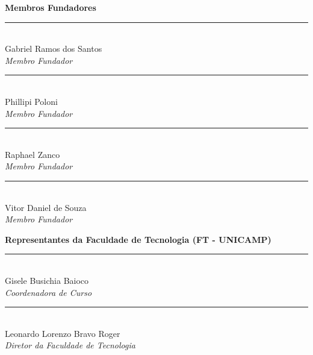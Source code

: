 \documentclass[12pt, a4paper]{article}
\begin{document}
\begin{center}

    \textbf{Membros Fundadores}
    \vspace{2cm}

    \begin{minipage}{0.45\textwidth}
        \centering
        \rule{6cm}{0.4pt} \\
        Gabriel Ramos dos Santos \\
        \textit{Membro Fundador}
    \end{minipage}
    \hspace{0.05\textwidth}
    \begin{minipage}{0.45\textwidth}
        \centering
        \rule{6cm}{0.4pt} \\
        Phillipi Poloni \\
        \textit{Membro Fundador}
    \end{minipage}

    \vspace{2cm}

    \begin{minipage}{0.45\textwidth}
        \centering
        \rule{6cm}{0.4pt} \\
        Raphael Zanco \\
        \textit{Membro Fundador}
    \end{minipage}
    \hspace{0.05\textwidth}
    \begin{minipage}{0.45\textwidth}
        \centering
        \rule{6cm}{0.4pt} \\
        Vitor Daniel de Souza \\
        \textit{Membro Fundador}
    \end{minipage}

    \vspace{2cm}

    \textbf{Representantes da Faculdade de Tecnologia (FT - UNICAMP)}
    \vspace{2cm}

    \begin{minipage}{0.45\textwidth}
        \centering
        \rule{6cm}{0.4pt} \\
        Gisele Busichia Baioco \\
        \textit{Coordenadora de Curso}
    \end{minipage}
    \hspace{0.05\textwidth}
    \begin{minipage}{0.45\textwidth}
        \centering
        \rule{6cm}{0.4pt} \\
        Leonardo Lorenzo Bravo Roger \\
        \textit{Diretor da Faculdade de Tecnologia}
    \end{minipage}

\end{center}
\end{document}
